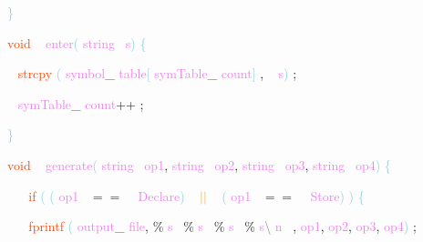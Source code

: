 \documentclass[8, usernames, dvipsnames]{beamer}
\begin{document}
\begin{frame}
\textcolor{SkyBlue}{\} }

 
 \textcolor{OrangeRed}{void}
\textcolor{White}{\ }
\textcolor{Violet}{enter}\textcolor{SkyBlue}{(}
\textcolor{Violet}{string}\textcolor{White}{\ }
\textcolor{Violet}{s}\textcolor{SkyBlue}{)}
\textcolor{SkyBlue}{\{ }

 \textcolor{White}{\   }
\textcolor{OrangeRed}{strcpy}
\textcolor{SkyBlue}{(}
\textcolor{Violet}{symbol}\textcolor{Sepia}{\_}
\textcolor{Violet}{table}\textcolor{SkyBlue}{[}
\textcolor{Violet}{symTable}\textcolor{Sepia}{\_}
\textcolor{Violet}{count}\textcolor{SkyBlue}{]}
\textcolor{Sepia}{,}
\textcolor{White}{\ }
\textcolor{Violet}{s}\textcolor{SkyBlue}{)}
\textcolor{Sepia}{;}

 \textcolor{White}{\   }
\textcolor{Violet}{symTable}\textcolor{Sepia}{\_}
\textcolor{Violet}{count}\textcolor{Apricot}{++}
\textcolor{Sepia}{;}

 \textcolor{SkyBlue}{\} }

 
 \textcolor{OrangeRed}{void}
\textcolor{White}{\ }
\textcolor{Violet}{generate}\textcolor{SkyBlue}{(}
\textcolor{Violet}{string}\textcolor{White}{\ }
\textcolor{Violet}{op1}\textcolor{Sepia}{,}
\textcolor{Violet}{string}\textcolor{White}{\ }
\textcolor{Violet}{op2}\textcolor{Sepia}{,}
\textcolor{Violet}{string}\textcolor{White}{\ }
\textcolor{Violet}{op3}\textcolor{Sepia}{,}
\textcolor{Violet}{string}\textcolor{White}{\ }
\textcolor{Violet}{op4}\textcolor{SkyBlue}{)}
\textcolor{SkyBlue}{\{ }

 \textcolor{White}{\   }
\textcolor{White}{\   }
\textcolor{OrangeRed}{if}
\textcolor{SkyBlue}{(}
\textcolor{SkyBlue}{(}
\textcolor{Violet}{op1}\textcolor{White}{\ }
\textcolor{OliveGreen}{$==$}
\textcolor{White}{\ }
\textcolor{Violet}{Declare}\textcolor{SkyBlue}{)}
\textcolor{White}{\ }
\textcolor{Goldenrod}{ $||$ }
\textcolor{White}{\ }
\textcolor{SkyBlue}{(}
\textcolor{Violet}{op1}\textcolor{White}{\ }
\textcolor{OliveGreen}{$==$}
\textcolor{White}{\ }
\textcolor{Violet}{Store}\textcolor{SkyBlue}{)}
\textcolor{SkyBlue}{)}
\textcolor{SkyBlue}{\{ }

 \textcolor{White}{\   }
\textcolor{White}{\   }
\textcolor{OrangeRed}{fprintf}
\textcolor{SkyBlue}{(}
\textcolor{Violet}{output}\textcolor{Sepia}{\_}
\textcolor{Violet}{file}\textcolor{Sepia}{,}
\textcolor{Apricot}{\%}
\textcolor{Violet}{s}\textcolor{White}{\ }
\textcolor{Apricot}{\%}
\textcolor{Violet}{s}\textcolor{White}{\ }
\textcolor{Apricot}{\%}
\textcolor{Violet}{s}\textcolor{White}{\ }
\textcolor{Apricot}{\%}
\textcolor{Violet}{s}\textcolor{Gray}{\textbackslash }
\textcolor{Violet}{n}\textcolor{White}{\ }
\textcolor{Sepia}{,}
\textcolor{Violet}{op1}\textcolor{Sepia}{,}
\textcolor{Violet}{op2}\textcolor{Sepia}{,}
\textcolor{Violet}{op3}\textcolor{Sepia}{,}
\textcolor{Violet}{op4}\textcolor{SkyBlue}{)}
\textcolor{Sepia}{;}

 \end{frame}
\end{document}
